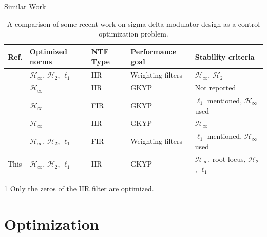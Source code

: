 \documentclass[10pt,usenames,dvipsnames]{beamer}
\begin{document}
\begin{frame}{Similar Work}

\vspace{-0.8cm}
\begin{table}
\begin{threeparttable}
	\caption{A comparison of some recent work on sigma delta modulator design as a control optimization problem.}
	\begin{tabular}{p{0.5cm} p{1.8cm} p{0.6cm} p{1.9cm} p{3.3cm}}
		\toprule
		\textbf{Ref.} & \textbf{Optimized norms} & \textbf{NTF Type} & \textbf{Performance goal} & \textbf{Stability criteria} \\
		\midrule
		\cite{Oberoi2004} & $\mathcal{H}_\infty$, $\mathcal{H}_2$, $\ell_1$ & IIR &  Weighting filters & $\mathcal{H}_\infty$, $\mathcal{H}_2$ \pause \\ 
		\cite{Osqui2007} & $\mathcal{H}_\infty$ & IIR\tnote{1} & GKYP & Not reported \pause \\
		\cite{Nagahara2012} & $\mathcal{H}_\infty$ & FIR & GKYP & $\ell_1$ mentioned, $\mathcal{H}_\infty$ used \pause \\
		\cite{Li2014} & $\mathcal{H}_\infty$ & IIR & GKYP & $\mathcal{H}_\infty$ \pause \\
		\cite{Tariq2016} & $\mathcal{H}_\infty$, $\mathcal{H}_2$, $\ell_1$ & FIR & Weighting filters & $\ell_1$ mentioned, $\mathcal{H}_\infty$ used \pause \\
		This & $\mathcal{H}_\infty$, $\mathcal{H}_2$, $\ell_1$ & IIR & GKYP & $\mathcal{H}_\infty$, root locus, $\mathcal{H}_2$, $\ell_1$ \\
		\bottomrule
	\end{tabular}
	\begin{tablenotes}
		\item[1] Only the zeros of the IIR filter are optimized.
	\end{tablenotes}
\end{threeparttable}
\end{table}

\end{frame}

\section{Optimization}
\end{document}
